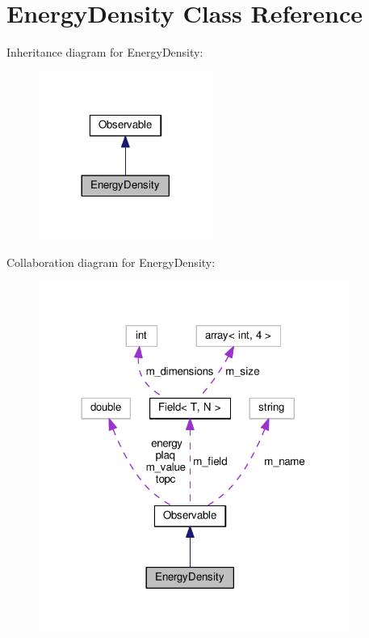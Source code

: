\hypertarget{classEnergyDensity}{}\section{Energy\+Density Class Reference}
\label{classEnergyDensity}


Inheritance diagram for Energy\+Density\+:
\nopagebreak
\begin{figure}[H]
\begin{center}
\leavevmode
\includegraphics[width=161pt]{classEnergyDensity__inherit__graph}
\end{center}
\end{figure}


Collaboration diagram for Energy\+Density\+:
\nopagebreak
\begin{figure}[H]
\begin{center}
\leavevmode
\includegraphics[width=288pt]{classEnergyDensity__coll__graph}
\end{center}
\end{figure}
